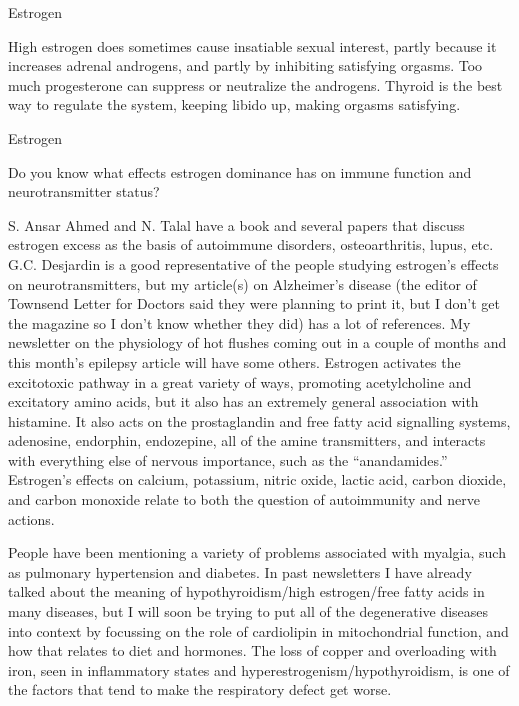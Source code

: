\documentclass[11pt,oneside,openany,extrafontsizes]{memoir}
\begin{document}
\begin{standalonequote}{Estrogen}

    \begin{answer}
        High estrogen does sometimes cause insatiable sexual interest, partly because it increases adrenal androgens, and partly by inhibiting satisfying orgasms. Too much progesterone can suppress or neutralize the androgens. Thyroid is the best way to regulate the system, keeping libido up, making orgasms satisfying.
    \end{answer}
\end{standalonequote}

\begin{qaexchange}{Estrogen}

    \begin{question}
        Do you know what effects estrogen dominance has on immune function and neurotransmitter status?
    \end{question}

    \begin{answer}
        S. Ansar Ahmed and N. Talal have a book and several papers that discuss estrogen excess as the basis of autoimmune disorders, osteoarthritis, lupus, etc. G.C. Desjardin is a good representative of the people studying estrogen's effects on neurotransmitters, but my article(s) on Alzheimer's disease (the editor of Townsend Letter for Doctors said they were planning to print it, but I don't get the magazine so I don't know whether they did) has a lot of references. My newsletter on the physiology of hot flushes coming out in a couple of months and this month's epilepsy article will have some others. Estrogen activates the excitotoxic pathway in a great variety of ways, promoting acetylcholine and excitatory amino acids, but it also has an extremely general association with histamine. It also acts on the prostaglandin and free fatty acid signalling systems, adenosine, endorphin, endozepine, all of the amine transmitters, and interacts with everything else of nervous importance, such as the \enquote{anandamides.} Estrogen's effects on calcium, potassium, nitric oxide, lactic acid, carbon dioxide, and carbon monoxide relate to both the question of autoimmunity and nerve actions.

        People have been mentioning a variety of problems associated with myalgia, such as pulmonary hypertension and diabetes. In past newsletters I have already talked about the meaning of hypothyroidism/high estrogen/free fatty acids in many diseases, but I will soon be trying to put all of the degenerative diseases into context by focussing on the role of cardiolipin in mitochondrial function, and how that relates to diet and hormones. The loss of copper and overloading with iron, seen in inflammatory states and hyperestrogenism/hypothyroidism, is one of the factors that tend to make the respiratory defect get worse.
    \end{answer}
\end{qaexchange}
\end{document}
